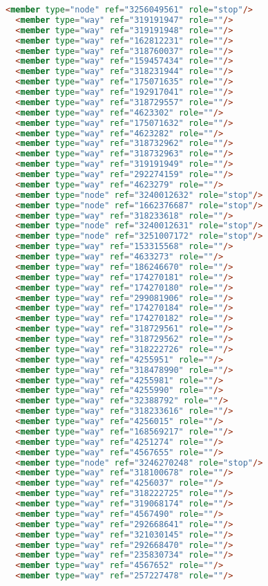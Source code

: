 \begin{lstlisting}[language=HTML,basicstyle=\tiny,caption=bandung1.xml]
  <member type="node" ref="3256049561" role="stop"/>
  <member type="way" ref="319191947" role=""/>
  <member type="way" ref="319191948" role=""/>
  <member type="way" ref="162812231" role=""/>
  <member type="way" ref="318760037" role=""/>
  <member type="way" ref="159457434" role=""/>
  <member type="way" ref="318231944" role=""/>
  <member type="way" ref="175071635" role=""/>
  <member type="way" ref="192917041" role=""/>
  <member type="way" ref="318729557" role=""/>
  <member type="way" ref="4623302" role=""/>
  <member type="way" ref="175071632" role=""/>
  <member type="way" ref="4623282" role=""/>
  <member type="way" ref="318732962" role=""/>
  <member type="way" ref="318732963" role=""/>
  <member type="way" ref="319191949" role=""/>
  <member type="way" ref="292274159" role=""/>
  <member type="way" ref="4623279" role=""/>
  <member type="node" ref="3240012632" role="stop"/>
  <member type="node" ref="1662376687" role="stop"/>
  <member type="way" ref="318233618" role=""/>
  <member type="node" ref="3240012631" role="stop"/>
  <member type="node" ref="3251007172" role="stop"/>
  <member type="way" ref="153315568" role=""/>
  <member type="way" ref="4633273" role=""/>
  <member type="way" ref="186246670" role=""/>
  <member type="way" ref="174270181" role=""/>
  <member type="way" ref="174270180" role=""/>
  <member type="way" ref="299081906" role=""/>
  <member type="way" ref="174270184" role=""/>
  <member type="way" ref="174270182" role=""/>
  <member type="way" ref="318729561" role=""/>
  <member type="way" ref="318729562" role=""/>
  <member type="way" ref="318222726" role=""/>
  <member type="way" ref="4255951" role=""/>
  <member type="way" ref="318478990" role=""/>
  <member type="way" ref="4255981" role=""/>
  <member type="way" ref="4255990" role=""/>
  <member type="way" ref="32388792" role=""/>
  <member type="way" ref="318233616" role=""/>
  <member type="way" ref="4256015" role=""/>
  <member type="way" ref="168569217" role=""/>
  <member type="way" ref="4251274" role=""/>
  <member type="way" ref="4567655" role=""/>
  <member type="node" ref="3246270248" role="stop"/>
  <member type="way" ref="318100678" role=""/>
  <member type="way" ref="4256037" role=""/>
  <member type="way" ref="318222725" role=""/>
  <member type="way" ref="319068174" role=""/>
  <member type="way" ref="4567490" role=""/>
  <member type="way" ref="292668641" role=""/>
  <member type="way" ref="321030145" role=""/>
  <member type="way" ref="292668470" role=""/>
  <member type="way" ref="235830734" role=""/>
  <member type="way" ref="4567652" role=""/>
  <member type="way" ref="257227478" role=""/>

\end{lstlisting}
